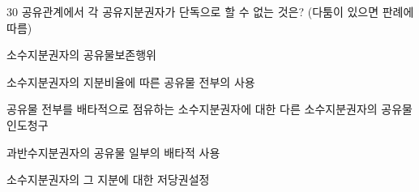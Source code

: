 \begin{question}{30}
공유관계에서 각 공유지분권자가 단독으로 할 수 없는 것은? (다툼이 있으면 판례에 따름)
\begin{choices}
  \item 소수지분권자의 공유물보존행위
  \item 소수지분권자의 지분비율에 따른 공유물 전부의 사용
  \item 공유물 전부를 배타적으로 점유하는 소수지분권자에 대한 다른 소수지분권자의 공유물인도청구
  \item 과반수지분권자의 공유물 일부의 배타적 사용
  \item 소수지분권자의 그 지분에 대한 저당권설정
\end{choices}
\end{question}
